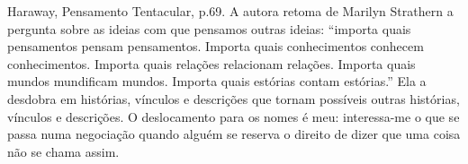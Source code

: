 Haraway, Pensamento Tentacular, p.69.
A autora retoma de Marilyn Strathern a pergunta sobre as ideias com que pensamos outras ideias: \enquote{importa quais pensamentos pensam pensamentos. Importa quais conhecimentos conhecem conhecimentos. Importa quais relações relacionam relações. Importa quais mundos mundificam mundos. Importa quais estórias contam estórias.} Ela a desdobra em histórias, vínculos e descrições que tornam possíveis outras histórias, vínculos e descrições. O deslocamento para os nomes é meu: interessa-me o que se passa numa negociação quando alguém se reserva o direito de dizer que uma coisa não se chama assim.
